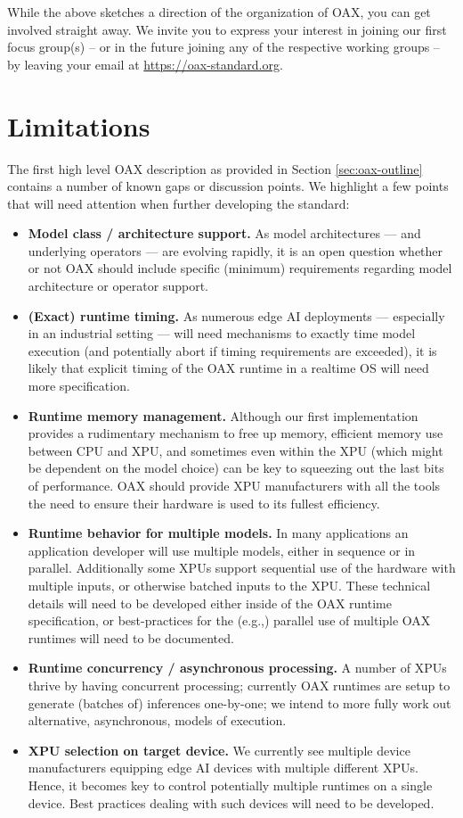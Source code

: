 \documentclass{article}
\newcommand{\oaxweb}{\href{https://oax-standard.org}{https://oax-standard.org}}
\begin{document}
While the above sketches a direction of the organization of OAX, you can get involved straight away. We invite you to express your interest in joining our first focus group(s) -- or in the future joining any of the respective working groups -- by leaving your email at \oaxweb.

\section{Limitations}

The first high level OAX  description as provided in Section \ref{sec:oax-outline} contains a number of known gaps or discussion points. We highlight a few points that will need attention when further developing the standard:

\begin{itemize}
\item \textbf{Model class / architecture support.} As model architectures --- and underlying operators --- are evolving rapidly, it is an open question whether or not OAX should include specific (minimum) requirements regarding model architecture or operator support.
\item \textbf{(Exact) runtime timing.} As numerous edge AI deployments --- especially in an industrial setting --- will need mechanisms to exactly time model execution (and potentially abort if timing requirements are exceeded), it is likely that explicit timing of the OAX runtime in a realtime OS will need more specification.
\item \textbf{Runtime memory management.} Although our first implementation provides a rudimentary mechanism to free up memory, efficient memory use between CPU and XPU, and sometimes even within the XPU (which might be dependent on the model choice) can be key to squeezing out the last bits of performance. OAX should provide XPU manufacturers with all the tools the need to ensure their hardware is used to its fullest efficiency.
\item \textbf{Runtime behavior for multiple models.} In many applications an application developer will use multiple models, either in sequence or in parallel. Additionally some XPUs support sequential use of the hardware with multiple inputs, or otherwise batched inputs to the XPU. These technical details will need to be developed either inside of the OAX runtime specification, or best-practices for the (e.g.,) parallel use of multiple OAX runtimes will need to be documented.
\item \textbf{Runtime concurrency / asynchronous processing.} A number of XPUs thrive by having concurrent processing; currently OAX runtimes are setup to generate (batches of) inferences one-by-one; we intend to more fully work out alternative, asynchronous, models of execution.
\item \textbf{XPU selection on target device.} We currently see multiple device manufacturers equipping edge AI devices with multiple different XPUs. Hence, it becomes key to control potentially multiple runtimes on a single device. Best practices dealing with such devices will need to be developed.
\end{itemize}
\end{document}
